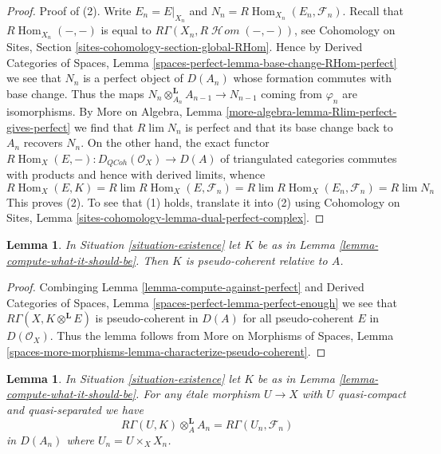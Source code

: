 \documentclass{stacks-project}
\theoremstyle{plain}
\newtheorem{lemma}[subsection]{Lemma}
\theoremstyle{definition}
\theoremstyle{remark}
\numberwithin{equation}{subsection}
\def\lim{\mathop{\mathrm{lim}}\nolimits}
\def\Hom{\mathop{\mathrm{Hom}}\nolimits}
\def\SheafHom{\mathop{\mathcal{H}\!\mathit{om}}\nolimits}
\def\QCoh{\mathit{QCoh}}
\begin{document}
\begin{proof}
Proof of (2). Write $E_n = E|_{X_n}$ and
$N_n = R\Hom_{X_n}(E_n, \mathcal{F}_n)$.
Recall that $R\Hom_{X_n}(-, -)$ is equal to
$R\Gamma(X_n, R\SheafHom(-, -))$, see
Cohomology on Sites, Section \ref{sites-cohomology-section-global-RHom}.
Hence by Derived Categories of Spaces, Lemma
\ref{spaces-perfect-lemma-base-change-RHom-perfect}
we see that $N_n$ is a perfect object of $D(A_n)$
whose formation commutes with base change. Thus the maps
$N_n \otimes_{A_n}^\mathbf{L} A_{n - 1} \to N_{n - 1}$
coming from $\varphi_n$ are isomorphisms.
By More on Algebra, Lemma \ref{more-algebra-lemma-Rlim-perfect-gives-perfect}
we find that $R\lim N_n$ is perfect and
that its base change back to $A_n$ recovers $N_n$.
On the other hand, the exact functor
$R\Hom_X(E, -) : D_\QCoh(\mathcal{O}_X) \to D(A)$
of triangulated categories commutes with products
and hence with derived limits, whence
$$
R\Hom_X(E, K) =
R\lim R\Hom_X(E, \mathcal{F}_n) =
R\lim R\Hom_X(E_n, \mathcal{F}_n) =
R\lim N_n
$$
This proves (2). To see that (1) holds, translate it into (2)
using Cohomology on Sites, Lemma
\ref{sites-cohomology-lemma-dual-perfect-complex}.
\end{proof}

\begin{lemma}
\label{lemma-relative-pseudo-coherence}
In Situation \ref{situation-existence} let $K$ be as in
Lemma \ref{lemma-compute-what-it-should-be}. Then $K$
is pseudo-coherent relative to $A$.
\end{lemma}

\begin{proof}
Combinging Lemma \ref{lemma-compute-against-perfect} and
Derived Categories of Spaces, Lemma \ref{spaces-perfect-lemma-perfect-enough}
we see that $R\Gamma(X, K \otimes^\mathbf{L} E)$
is pseudo-coherent in $D(A)$ for all pseudo-coherent
$E$ in $D(\mathcal{O}_X)$. Thus the lemma follows from
More on Morphisms of Spaces, Lemma
\ref{spaces-more-morphisms-lemma-characterize-pseudo-coherent}.
\end{proof}

\begin{lemma}
\label{lemma-compute-over-affine}
In Situation \ref{situation-existence} let $K$ be as in
Lemma \ref{lemma-compute-what-it-should-be}. For any
\'etale morphism $U \to X$ with $U$ quasi-compact and quasi-separated we have
$$
R\Gamma(U, K) \otimes_A^\mathbf{L} A_n =
R\Gamma(U_n, \mathcal{F}_n)
$$
in $D(A_n)$ where $U_n = U \times_X X_n$.
\end{lemma}
\end{document}
